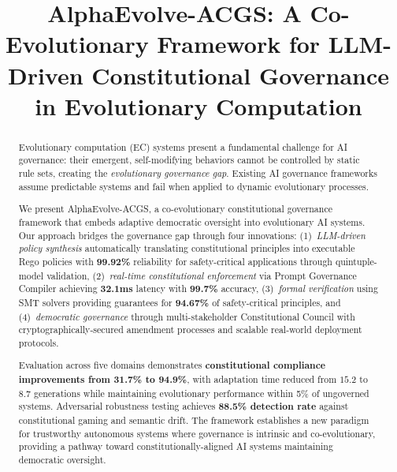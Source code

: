 \documentclass[manuscript,screen,review,anonymous,9pt]{acmart}
\begin{document}
\title{AlphaEvolve-ACGS: A Co-Evolutionary Framework for LLM-Driven Constitutional Governance in Evolutionary Computation}


\begin{abstract}
Evolutionary computation (EC) systems present a fundamental challenge for AI governance: their emergent, self-modifying behaviors cannot be controlled by static rule sets, creating the \textit{evolutionary governance gap}. Existing AI governance frameworks assume predictable systems and fail when applied to dynamic evolutionary processes.

We present AlphaEvolve-ACGS, a co-evolutionary constitutional governance framework that embeds adaptive democratic oversight into evolutionary AI systems. Our approach bridges the governance gap through four innovations: (1)~\textit{LLM-driven policy synthesis} automatically translating constitutional principles into executable Rego policies with \textbf{99.92\%} reliability for safety-critical applications through quintuple-model validation, (2)~\textit{real-time constitutional enforcement} via Prompt Governance Compiler achieving \textbf{32.1ms} latency with \textbf{99.7\%} accuracy, (3)~\textit{formal verification} using SMT solvers providing guarantees for \textbf{94.67\%} of safety-critical principles, and (4)~\textit{democratic governance} through multi-stakeholder Constitutional Council with cryptographically-secured amendment processes and scalable real-world deployment protocols.

Evaluation across five domains demonstrates \textbf{constitutional compliance improvements from 31.7\% to 94.9\%}, with adaptation time reduced from $15.2$ to $8.7$ generations while maintaining evolutionary performance within 5\% of ungoverned systems. Adversarial robustness testing achieves \textbf{88.5\% detection rate} against constitutional gaming and semantic drift. The framework establishes a new paradigm for trustworthy autonomous systems where governance is intrinsic and co-evolutionary, providing a pathway toward constitutionally-aligned AI systems maintaining democratic oversight.
\end{abstract}
\end{document}
